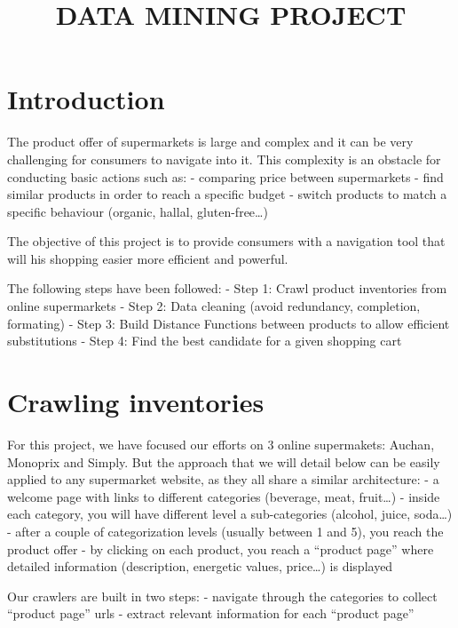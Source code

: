 \documentclass{article}
\title{DATA MINING PROJECT}
\begin{document}
    
    
    \maketitle
    
    

    

    \section{Introduction}


    The product offer of supermarkets is large and complex and it can be
very challenging for consumers to navigate into it. This complexity is
an obstacle for conducting basic actions such as: - comparing price
between supermarkets - find similar products in order to reach a
specific budget - switch products to match a specific behaviour
(organic, hallal, gluten-free\ldots{})

The objective of this project is to provide consumers with a navigation
tool that will his shopping easier more efficient and powerful.

The following steps have been followed: - Step 1: Crawl product
inventories from online supermarkets - Step 2: Data cleaning (avoid
redundancy, completion, formating) - Step 3: Build Distance Functions
between products to allow efficient substitutions - Step 4: Find the
best candidate for a given shopping cart


    \section{Crawling inventories}


    For this project, we have focused our efforts on 3 online supermakets:
Auchan, Monoprix and Simply. But the approach that we will detail below
can be easily applied to any supermarket website, as they all share a
similar architecture: - a welcome page with links to different
categories (beverage, meat, fruit\ldots{}) - inside each category, you
will have different level a sub-categories (alcohol, juice,
soda\ldots{}) - after a couple of categorization levels (usually between
1 and 5), you reach the product offer - by clicking on each product, you
reach a ``product page'' where detailed information (description,
energetic values, price\ldots{}) is displayed

Our crawlers are built in two steps: - navigate through the categories
to collect ``product page'' urls - extract relevant information for each
``product page''
\end{document}
